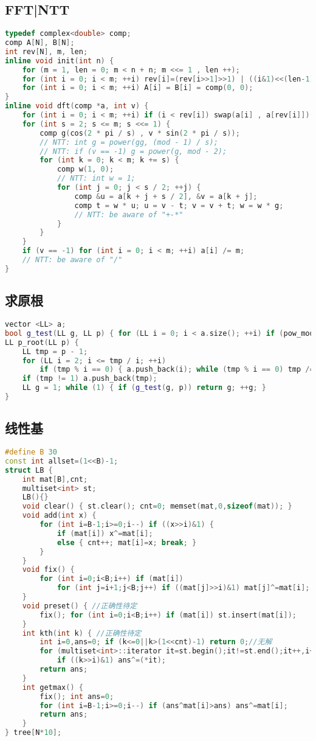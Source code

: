 \documentclass[landscape,a4paper]{article}
\begin{document}
\subsection{FFT|NTT}

\begin{lstlisting}[language=C++]
typedef complex<double> comp;
comp A[N], B[N];
int rev[N], m, len;
inline void init(int n) {
	for (m = 1, len = 0; m < n + n; m <<= 1 , len ++);
	for (int i = 0; i < m; ++i) rev[i]=(rev[i>>1]>>1) | ((i&1)<<(len-1));
	for (int i = 0; i < m; ++i) A[i] = B[i] = comp(0, 0);
}
inline void dft(comp *a, int v) {
	for (int i = 0; i < m; ++i) if (i < rev[i]) swap(a[i] , a[rev[i]]);
	for (int s = 2; s <= m; s <<= 1) {
		comp g(cos(2 * pi / s) , v * sin(2 * pi / s));
		// NTT: int g = power(gg, (mod - 1) / s);
		// NTT: if (v == -1) g = power(g, mod - 2);
		for (int k = 0; k < m; k += s) {
			comp w(1, 0);
			// NTT: int w = 1;
			for (int j = 0; j < s / 2; ++j) {
				comp &u = a[k + j + s / 2], &v = a[k + j];
				comp t = w * u; u = v - t; v = v + t; w = w * g;
				// NTT: be aware of "+-*"
			}
		}
	}
	if (v == -1) for (int i = 0; i < m; ++i) a[i] /= m;
	// NTT: be aware of "/"
}
\end{lstlisting}

\subsection{求原根}
\begin{lstlisting}[language=C++]
vector <LL> a;
bool g_test(LL g, LL p) { for (LL i = 0; i < a.size(); ++i) if (pow_mod(g, (p-1)/a[i], p) == 1) return 0; return 1; }
LL p_root(LL p) {
	LL tmp = p - 1;
	for (LL i = 2; i <= tmp / i; ++i)
		if (tmp % i == 0) { a.push_back(i); while (tmp % i == 0) tmp /= i; }
	if (tmp != 1) a.push_back(tmp);
	LL g = 1; while (1) { if (g_test(g, p)) return g; ++g; }
}
\end{lstlisting}

\subsection{线性基}

\begin{lstlisting}[language=C++]
#define B 30
const int allset=(1<<B)-1;
struct LB {
	int mat[B],cnt;
	multiset<int> st;
	LB(){}
	void clear() { st.clear(); cnt=0; memset(mat,0,sizeof(mat)); }
	void add(int x) {
		for (int i=B-1;i>=0;i--) if ((x>>i)&1) {
		    if (mat[i]) x^=mat[i]; 
		    else { cnt++; mat[i]=x; break; }
		}
	}
	void fix() {
		for (int i=0;i<B;i++) if (mat[i])
		    for (int j=i+1;j<B;j++) if ((mat[j]>>i)&1) mat[j]^=mat[i];
	}
	void preset() { //正确性待定
		fix(); for (int i=0;i<B;i++) if (mat[i]) st.insert(mat[i]);
	}
	int kth(int k) { //正确性待定
		int i=0,ans=0; if (k<=0||k>(1<<cnt)-1) return 0;//无解
		for (multiset<int>::iterator it=st.begin();it!=st.end();it++,i++)
			if ((k>>i)&1) ans^=(*it);
		return ans;
	}
	int getmax() {
		fix(); int ans=0;
		for (int i=B-1;i>=0;i--) if (ans^mat[i]>ans) ans^=mat[i];
		return ans;
	}
} tree[N*10];
\end{lstlisting}
\end{document}
